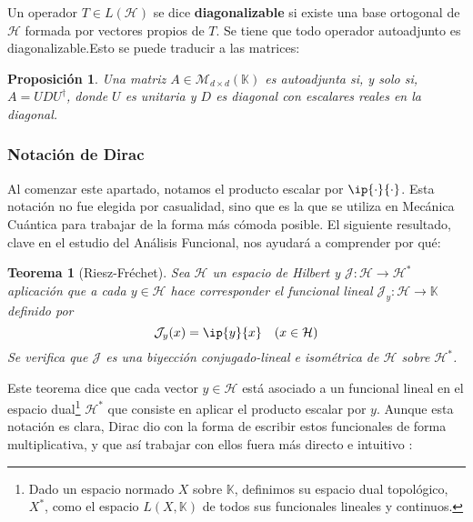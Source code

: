\documentclass[11pt,a4paper,twoside,pdf]{article}
\numberwithin{equation}{section}
\newtheorem{theorem}{Teorema}
\newtheorem{proposition}{Proposición}
\begin{document}
	Un operador $T\in L(\mathcal{H})$ se dice \textbf{diagonalizable} si existe una base ortogonal de $\mathcal{H}$ formada por vectores propios de $T$. Se tiene que todo operador autoadjunto es diagonalizable.Esto se puede traducir a las matrices:
	
	 \begin{proposition}
	 	Una matriz $A\in\mathcal{M}_{d\times d}(\mathbb{K})$ es autoadjunta si, y solo si, $A=UDU^\dagger$, donde $U$ es unitaria y $D$ es diagonal con escalares reales en la diagonal.
	 \end{proposition}
	
		\subsubsection{Notación de Dirac}
		
		Al comenzar este apartado, notamos el producto escalar por $\ip{\cdot}{\cdot}$. Esta notación no fue elegida por casualidad, sino que es la que se utiliza en Mecánica Cuántica para trabajar de la forma más cómoda posible. El siguiente resultado, clave en el estudio del Análisis Funcional, nos ayudará a comprender por qué:
		
			\begin{theorem}[Riesz-Fréchet]
				Sea $\mathcal{H}$ un espacio de Hilbert y $\mathcal{J} : \mathcal{H} \rightarrow \mathcal{H}^*$ aplicación que a cada $y\in\mathcal{H}$ hace corresponder el funcional lineal $\mathcal{J}_y:\mathcal{H}\rightarrow \mathbb{K}$ definido por
					\begin{equation}
						\mathcal{J}_y(x) = \ip{y}{x} \quad (x\in \mathcal{H})
					\end{equation}
				Se verifica que $\mathcal{J}$ es una biyección conjugado-lineal e isométrica de $\mathcal{H}$ sobre $\mathcal{H}^*$.
			\end{theorem}
		
		Este teorema dice que cada vector $y \in \mathcal{H}$ está asociado a un funcional lineal en el espacio dual\footnote{Dado un espacio normado $X$ sobre $\mathbb{K}$, definimos su espacio dual topológico, $X^*$, como el espacio $L(X,\mathbb{K})$ de todos sus funcionales lineales y continuos.} $\mathcal{H}^*$ que consiste en aplicar el producto escalar por $y$. Aunque esta notación es clara, Dirac dio con la forma de escribir estos funcionales de forma multiplicativa, y que así trabajar con ellos fuera más directo e intuitivo \cite{Dirac}:
		
\end{document}

